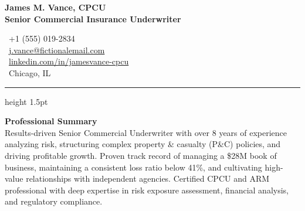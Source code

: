 \documentclass[10pt,letterpaper]{article}
\begin{document}
\color{bodytext}

\noindent
\begin{minipage}[t]{0.6\textwidth}
    {\Huge\bfseries\color{primary} James M. Vance, CPCU} \\[\baselineskip]
    {\large\color{secondary}\bfseries Senior Commercial Insurance Underwriter}
\end{minipage}%
\begin{minipage}[t]{0.4\textwidth}
    \raggedleft\small
    \faPhone\ +1 (555) 019-2834 \\
    \faEnvelope\ \href{mailto:j.vance@fictionalemail.com}{j.vance@fictionalemail.com} \\
    \faLinkedin\ \href{https://linkedin.com/in/jamesvance-cpcu}{linkedin.com/in/jamesvance-cpcu} \\
    \faMapMarker\ Chicago, IL
\end{minipage}

\vspace{0.4em}
{\color{primary}\hrule height 1.5pt}
\vspace{0.8em}

\noindent
\textbf{\color{primary}Professional Summary} \\
Results-driven Senior Commercial Underwriter with over 8 years of experience analyzing risk, structuring complex property \& casualty (P\&C) policies, and driving profitable growth. Proven track record of managing a \$28M book of business, maintaining a consistent loss ratio below 41\%, and cultivating high-value relationships with independent agencies. Certified CPCU and ARM professional with deep expertise in risk exposure assessment, financial analysis, and regulatory compliance.

\vspace{0.8em}
\end{document}
